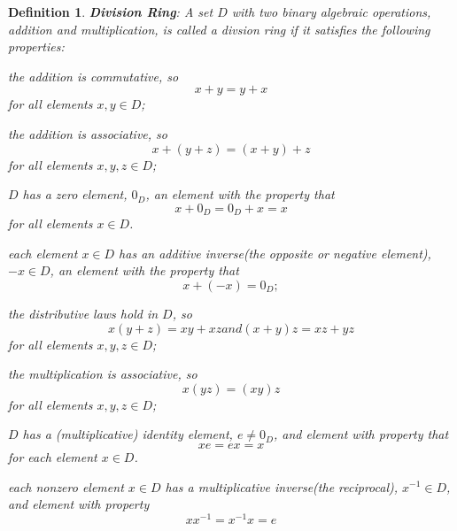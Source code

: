 \documentclass[a4paper]{book}
\newtheorem{definition}{Definition}[section]
\begin{document}
    \begin{definition}
      \textbf{Division Ring}: A set $D$ with two binary algebraic
      operations, addition and multiplication, is called a divsion ring if
      it satisfies the following properties:
      \begin{compactitem}
      \item
        the addition is commutative, so 
        \begin{displaymath}
          x + y = y + x
        \end{displaymath}
        for all elements $x,y \in D$;
      \item
        the addition is associative, so
        \begin{displaymath}
          x + (y + z) = (x + y) + z
        \end{displaymath}
        for all elements $x,y,z \in D$;
      \item
        $D$ has a zero element, $0_D$, an element with the property that 
        \begin{displaymath}
          x + 0_D = 0_D + x = x
        \end{displaymath}
        for all elements $x \in D$.
      \item
        each element $x \in D$ has an additive inverse(the opposite or
        negative element), $-x \in D$, an element with the property that
        \begin{displaymath}
          x + (-x) = 0_D;
        \end{displaymath}
      \item
        the distributive laws hold in $D$, so
        \begin{displaymath}
          x(y + z) = xy + xz and (x + y)z = xz + yz
        \end{displaymath}
        for all elements $x,y,z \in D$;
      \item
        the multiplication is associative, so
        \begin{displaymath}
          x(yz) = (xy)z
        \end{displaymath}
        for all elements $x,y,z \in D$;
      \item
        $D$ has a (multiplicative) identity element, $e \neq 0_D$, and
        element with property that
        \begin{displaymath}
          xe = ex = x
        \end{displaymath}
        for each element $x \in D$.
      \item
        each nonzero element $x \in D$ has a multiplicative inverse(the
        reciprocal), $x^{-1} \in D$, and element with property
        \begin{displaymath}
          xx^{-1} = x^{-1}x = e
        \end{displaymath}
      \end{compactitem}\cite{dixon2011algebra}
    \end{definition}
\end{document}
